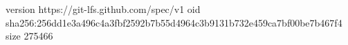 version https://git-lfs.github.com/spec/v1
oid sha256:256dd1e3a496c4a3fbf2592b7b55d4964c3b9131b732e459ca7bf00be7b467f4
size 275466
